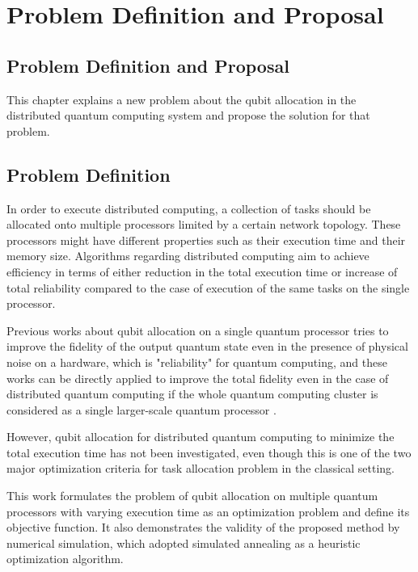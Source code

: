 \chapter{Problem Definition and Proposal}
\label{problem_definition_and_proposal}

\section{Problem Definition and Proposal}

This chapter explains a new problem about the qubit allocation in the \\ distributed quantum computing system and propose the solution for that problem.

\section{Problem Definition}

 In order to execute distributed computing, a collection of tasks should be allocated onto multiple processors limited by a certain network topology.  These processors might have different properties such as their execution time and their memory size.  Algorithms regarding distributed computing aim to achieve efficiency in terms of either reduction in the total execution time or increase of total reliability compared to the case of execution of the same tasks on the single processor.

Previous works about qubit allocation on a single quantum processor tries to improve the fidelity of the output quantum state even in the presence of physical noise on a hardware, which is "reliability" for quantum computing, and these works can be directly applied to improve the total fidelity even in the case of distributed quantum computing if the whole quantum computing cluster is considered as a single larger-scale quantum processor .

 However, qubit allocation for distributed quantum computing to minimize the total execution time has not been investigated, even though this is one of the two major optimization criteria for task allocation problem in the classical setting. 
 
 This work formulates the problem of qubit allocation on multiple quantum processors with varying execution time as an optimization problem and define its objective function.  It also demonstrates the validity of the proposed method by numerical simulation, which adopted simulated annealing as a heuristic optimization algorithm.
 
